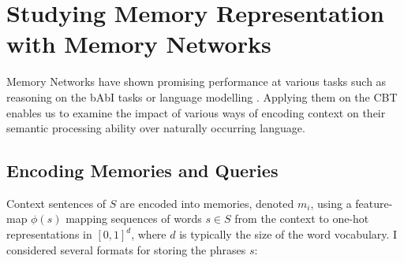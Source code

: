 \section{Studying Memory Representation with Memory Networks}

\label{sec:memnn}

Memory Networks \citep{weston2014memory} have shown promising performance at various tasks such as reasoning on the bAbI tasks \citep{weston2015towards} or language modelling \citep{sukhbaatar2015end}. Applying them on the CBT enables us to examine the impact of various ways of encoding  context on their semantic processing ability over naturally occurring language. 


\subsection{Encoding Memories and Queries}


Context sentences of $S$ are encoded into memories, denoted $m_i$, using a feature-map \(\phi(s)\) mapping sequences of words \(s \in S\) from the context to one-hot representations in \([0,1]^d\), where $d$ is typically the size of the word vocabulary. I considered several formats for storing the phrases \(s\):

